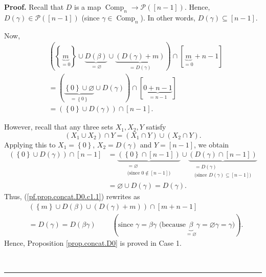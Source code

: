 \documentclass[numbers=enddot,12pt,final,onecolumn,notitlepage]{scrartcl}%
\theoremstyle{definition}
\newenvironment{proof}[1][Proof]{\noindent\textbf{#1.} }{\ \rule{0.5em}{0.5em}}
\begin{document}
\begin{proof}
Recall that $D$ is a map $\operatorname*{Comp}\nolimits_{n}\rightarrow
\mathcal{P}\left(  \left[  n-1\right]  \right)  $. Hence, $D\left(
\gamma\right)  \in\mathcal{P}\left(  \left[  n-1\right]  \right)  $ (since
$\gamma\in\operatorname*{Comp}\nolimits_{n}$). In other words, $D\left(
\gamma\right)  \subseteq\left[  n-1\right]  $.

Now,%
\begin{align}
&  \left(  \left\{  \underbrace{m}_{=0}\right\}  \cup\underbrace{D\left(
\beta\right)  }_{=\varnothing}\cup\underbrace{\left(  D\left(  \gamma\right)
+m\right)  }_{=D\left(  \gamma\right)  }\right)  \cap\left[  \underbrace{m}%
_{=0}+n-1\right] \nonumber\\
&  =\left(  \underbrace{\left\{  0\right\}  \cup\varnothing}_{=\left\{
0\right\}  }\cup D\left(  \gamma\right)  \right)  \cap\left[
\underbrace{0+n-1}_{=n-1}\right] \nonumber\\
&  =\left(  \left\{  0\right\}  \cup D\left(  \gamma\right)  \right)
\cap\left[  n-1\right]  . \label{pf.prop.concat.D0.c1.1}%
\end{align}


However, recall that any three sets $X_{1},X_{2},Y$ satisfy%
\[
\left(  X_{1}\cup X_{2}\right)  \cap Y=\left(  X_{1}\cap Y\right)  \cup\left(
X_{2}\cap Y\right)  .
\]
Applying this to $X_{1}=\left\{  0\right\}  $, $X_{2}=D\left(  \gamma\right)
$ and $Y=\left[  n-1\right]  $, we obtain%
\begin{align*}
\left(  \left\{  0\right\}  \cup D\left(  \gamma\right)  \right)  \cap\left[
n-1\right]   &  =\underbrace{\left(  \left\{  0\right\}  \cap\left[
n-1\right]  \right)  }_{\substack{=\varnothing\\\text{(since }0\notin\left[
n-1\right]  \text{)}}}\cup\underbrace{\left(  D\left(  \gamma\right)
\cap\left[  n-1\right]  \right)  }_{\substack{=D\left(  \gamma\right)
\\\text{(since }D\left(  \gamma\right)  \subseteq\left[  n-1\right]  \text{)}%
}}\\
&  =\varnothing\cup D\left(  \gamma\right)  =D\left(  \gamma\right)  .
\end{align*}
Thus, (\ref{pf.prop.concat.D0.c1.1}) rewrites as%
\begin{align*}
&  \left(  \left\{  m\right\}  \cup D\left(  \beta\right)  \cup\left(
D\left(  \gamma\right)  +m\right)  \right)  \cap\left[  m+n-1\right] \\
&  =D\left(  \gamma\right)  =D\left(  \beta\gamma\right)
\ \ \ \ \ \ \ \ \ \ \left(  \text{since }\gamma=\beta\gamma\text{ (because
}\underbrace{\beta}_{=\varnothing}\gamma=\varnothing\gamma=\gamma
\text{)}\right)  .
\end{align*}
Hence, Proposition \ref{prop.concat.D0} is proved in Case 1.


\end{proof}
\end{document}

